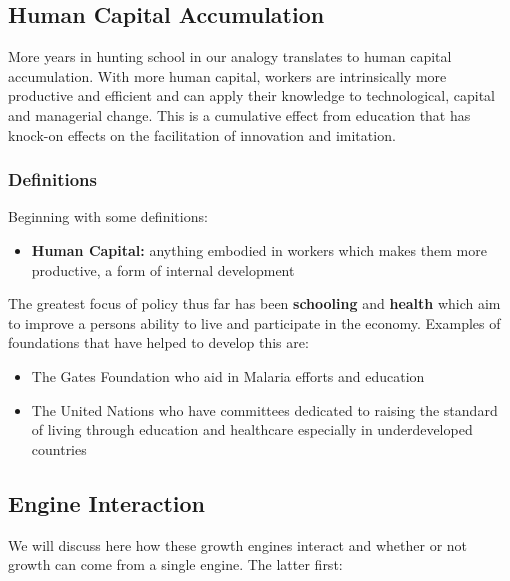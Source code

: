 \documentclass[12pt, letterpaper]{article}
\begin{document}
\subsection{Human Capital Accumulation}
More years in hunting school in our analogy translates to human capital accumulation. With more human capital, workers are intrinsically more productive and efficient and can apply their knowledge to technological, capital and managerial change. This is a cumulative effect from education that has knock-on effects on the facilitation of innovation and imitation.

\subsubsection{Definitions}
Beginning with some definitions:
\begin{itemize}
	\item \textbf{Human Capital:} anything embodied in workers which makes them more productive, a form of internal development
\end{itemize}
The greatest focus of policy thus far has been \textbf{schooling} and \textbf{health} which aim to improve a persons ability to live and participate in the economy. Examples of foundations that have helped to develop this are:
\begin{itemize}
	\item The Gates Foundation who aid in Malaria efforts and education
	\item The United Nations who have committees dedicated to raising the standard of living through education and healthcare especially in underdeveloped countries
\end{itemize}

\subsection{Engine Interaction}
We will discuss here how these growth engines interact and whether or not growth can come from a single engine. The latter first:

\begin{center}
\noindent{}
\end{center}
\end{document}

